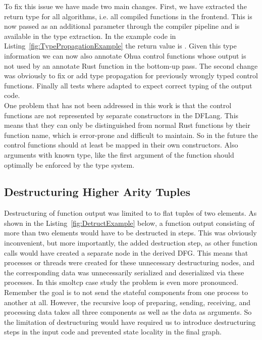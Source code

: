 To fix this issue we have made two main changes. First, we have extracted the return type for all algorithms, i.e. all compiled functions in the frontend. This is now passed as an additional parameter through the compiler pipeline and is available in the type extraction. In the example code in Listing~\ref{fig:TypePropagationExample} the return value is . Given this type information we can now also annotate Ohua control functions whose output is not used by an annotate Rust function in the bottom-up pass. The second change was obviously to fix or add type propagation for previously wrongly typed control functions. Finally all tests where adapted to expect correct typing of the output code. \\

One problem that has not been addressed in this work is that the control functions are not represented by separate constructors in the DFLang. This means that they can only be distinguished from normal Rust functions by their function name, which is error-prone and difficult to maintain. So in the future the control functions should at least be mapped in their own constructors. Also arguments with known type, like the first argument of the function  should optimally be enforced by the type system. 

\subsection{Destructuring Higher Arity Tuples}

Destructuring of function output was limited to to flat tuples of two elements. As shown in the Listing~\ref{fig:DetructExample} below, a function output consisting of more than two elements would have to be destructed in steps. This was obviously inconvenient, but more importantly, the added destruction step, as other function calls would have created a separate node in the derived DFG. This means that processes or threads were created for these unnecessary destructuring nodes, and the corresponding data was unnecessarily serialized and deserialized via these processes. In this smoltcp case study the problem is even more pronounced. Remember the goal is to not send the stateful components from one process to another at all. However, the recursive loop of preparing, sending, receiving, and processing data takes all three components as well as the data as arguments. So the limitation of destructuring would have required us to introduce destructuring steps in the input code and prevented state locality in the final graph. 

